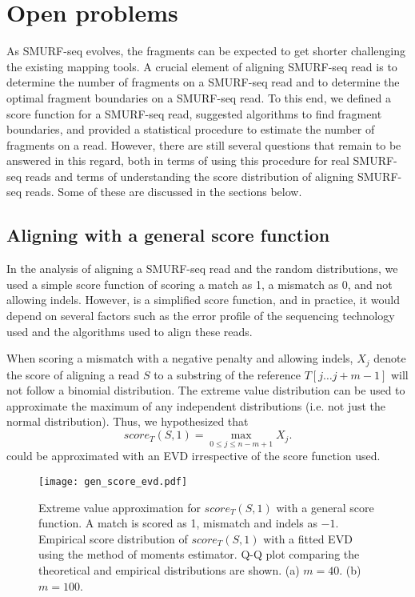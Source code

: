 \section{Open problems}
As SMURF-seq evolves, the fragments can be expected to get shorter
challenging the existing mapping tools. A crucial element of aligning
SMURF-seq read is to determine the number of fragments on a SMURF-seq
read and to determine the optimal fragment boundaries on a SMURF-seq
read. To this end, we defined a score function for a SMURF-seq read,
suggested algorithms to find fragment boundaries, and provided a
statistical procedure to estimate the number of fragments on a read.
%
However, there are still several questions that remain to be answered in
this regard, both in terms of using this procedure for real SMURF-seq
reads and terms of understanding the score distribution of aligning
SMURF-seq reads. Some of these are discussed in the sections below.


\subsection*{Aligning with a general score function}
In the analysis of aligning a SMURF-seq read and the random
distributions, we used a simple score function of scoring a match as 1, a
mismatch as 0, and not allowing indels. However, is a simplified score
function, and in practice, it would depend on several factors such as
the error profile of the sequencing technology used and the algorithms
used to align these reads.

When scoring a mismatch with a negative penalty and allowing indels,
$X_j$ denote the score of aligning a read $S$ to a substring of the
reference $T[j \dots j+m-1]$ will not follow a binomial distribution.
%
The extreme value distribution can be used to approximate the maximum of
any independent distributions (i.e. not just the normal distribution).
Thus, we hypothesized that \[score_T(S,1) = \max_{0 \leq j \leq n-m+1}
X_j.\]  could be approximated with an EVD irrespective of the score
function used.

\begin{figure}[t!]
\centering
\texttt{[image: gen\_score\_evd.pdf]}
\caption[Extreme value approximation for $score_T(S,1)$ with a general
  score function]{
  Extreme value approximation for $score_T(S,1)$ with a general score
  function. A match is scored as 1, mismatch and indels as $-1$.
  Empirical score distribution of $score_T(S,1)$ with a fitted
  EVD using the method of moments estimator.
  Q-Q plot comparing the theoretical and empirical distributions are shown.
  (a) $m=40$.
  (b) $m=100$.}
\label{gen_score_evd}
\end{figure}

